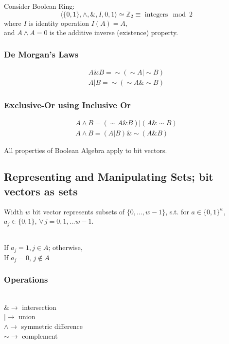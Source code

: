 \documentclass[10pt]{amsart}
\begin{document}
Consider Boolean Ring:
\[
\langle \lbrace 0 , 1 \rbrace, \wedge, \&, I, 0 , 1 \rangle \simeq \mathbb{Z}_2 \equiv  \text{ integers} \mod{2} 
\]
where $I$ is identity operation $I(A) = A$, \\
and 
$A\wedge A = 0$ is the additive inverse (existence) property.

\subsubsection{De Morgan's Laws}

\[
\begin{gathered}
A \& B = \sim (\sim A | \sim B) \\
A | B = \sim (\sim A \& \sim B)
\end{gathered}
\]

\subsubsection{Exclusive-Or using Inclusive Or}

\[
\begin{gathered} 
A \wedge B = (\sim A \& B) | (A \& \sim B) \\
A \wedge B = (A | B) \& \sim (A \& B)
\end{gathered} 
\]

All properties of Boolean Algebra apply to bit vectors.

\subsection{Representing and Manipulating Sets; bit vectors as sets}

Width $w$ bit vector represents subsets of $\lbrace 0 ,\dots, w-1 \rbrace$, s.t. for $a\in \lbrace 0 ,1 \rbrace^w$, $a_j \in \lbrace 0 , 1 \rbrace$, $\forall \, j = 0,1,\dots w -1$. 

\qquad \\
If $a_j = 1, j \in A$; otherwise, \\
If $a_j =0$, $j \notin A$
\qquad \\

\subsubsection{Operations}

\qquad \\
$\& \to $ intersection \\
$| \to $ union \\
$\wedge \to $ symmetric difference \\
$\sim \to $ complement
\qquad \\
\end{document}
